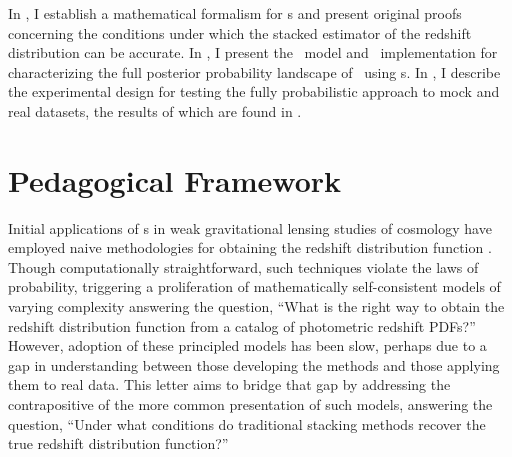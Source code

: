 
In , I establish a mathematical formalism for \pzpdf s and present original proofs concerning the conditions under which the stacked estimator of the redshift distribution can be accurate.
In , I present the \Chippr\ model and \chippr\ implementation for characterizing the full posterior probability landscape of \Nz\ using \pzpdf s. 
In , I describe the experimental design for testing the fully probabilistic approach to mock and real datasets, the results of which are found in .


\section{Pedagogical Framework}

Initial applications of \pzpdf s in weak gravitational lensing studies of cosmology have employed naive methodologies for obtaining the redshift distribution function \Nz.
Though computationally straightforward, such techniques violate the laws of probability, triggering a proliferation of mathematically self-consistent models of varying complexity answering the question, ``What is the right way to obtain the redshift distribution function from a catalog of photometric redshift PDFs?''
However, adoption of these principled models has been slow, perhaps due to a gap in understanding between those developing the methods and those applying them to real data.
This letter aims to bridge that gap by addressing the contrapositive of the more common presentation of such models, answering the question, ``Under what conditions do traditional stacking methods recover the true redshift distribution function?''


